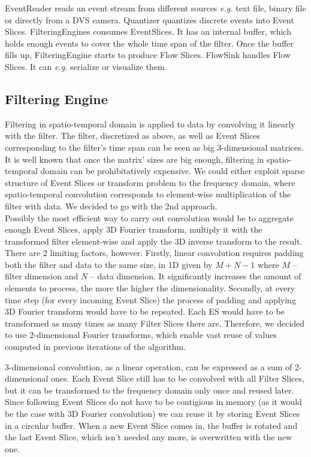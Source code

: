 EventReader reads an event stream from different sources \emph{e.g.} text file, binary file or directly from a DVS camera. 
Quantizer quantizes discrete events into Event Slices.
FilteringEngines consumes EventSlices. It has an internal buffer, which holds enough events to cover the whole time span of the filter. Once the buffer fills up, FilteringEngine starts to produce Flow Slices.
FlowSink handles Flow Slices. It can \emph{e.g.} serialize or visualize them.

\subsection{Filtering Engine}

Filtering in spatio-temporal domain is applied to data by convolving it linearly with the filter.
The filter, discretized as above, as well as Event Slices corresponding to the filter's time span can be seen as big 3-dimensional matrices.
It is well known that once the matrix' sizes are big enough, filtering in spatio-temporal domain can be prohibitatively expensive.
We could either exploit sparse structure of Event Slices or transform problem to the frequency domain, where spatio-temporal convolution corresponds to element-wise multiplication of the filter with data.
We decided to go with the 2nd approach.
\\

Possibly the most efficient way to carry out convolution would be to aggregate enough Event Slices, apply 3D Fourier transform, multiply it with the transformed filter element-wise and apply the 3D inverse transform to the result.
There are 2 limiting factors, however.
Firstly, linear convolution requires padding both the filter and data to the same size, in 1D given by $M+N-1$ where $M$ -- filter dimension and $N$ -- data dimension.
It significantly increases the amount of elements to process, the more the higher the dimensionality.
Secondly, at every time step (for every incoming Event Slice) the process of padding and applying 3D Fourier transform would have to be repeated.
Each ES would have to be transformed as many times as many Filter Slices there are.
Therefore, we decided to use 2-dimensional Fourier transforms, which enable vast reuse of values computed in previous iterations of the algorithm.

3-dimensional convolution, as a linear operation, can be expressed as a sum of 2-dimensional ones.
Each Event Slice still has to be convolved with all Filter Slices, but it can be transformed to the frequency domain only once and reused later.
Since following Event Slices do not have to be contigious in memory (as it would be the case with 3D Fourier convolution) we can reuse it by storing Event Slices in a circular buffer.
When a new Event Slice comes in, the buffer is rotated and the last Event Slice, which isn't needed any more, is overwritten with the new one.

